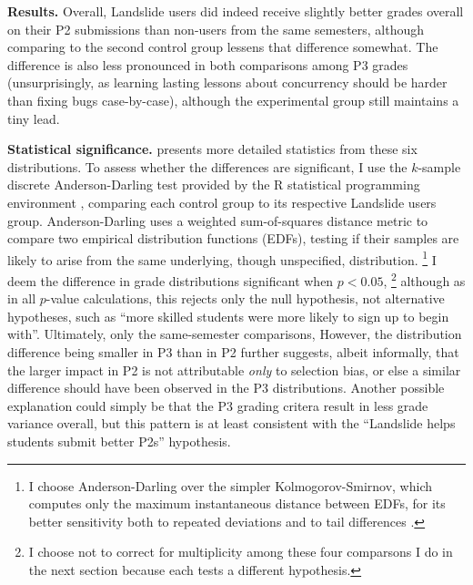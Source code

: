 {\bf Results.}
Overall,
Landslide users did indeed receive
slightly better grades overall on their P2 submissions than non-users from the same semesters,
although comparing to the second control group lessens that difference somewhat.
The difference is also less pronounced in both comparisons among P3 grades
(unsurprisingly, as learning lasting lessons about concurrency should be harder than fixing bugs case-by-case),
although the experimental group still maintains a tiny lead.

{\bf Statistical significance.}
 presents more detailed statistics from these six distributions.
To assess whether the differences are significant,
I use the $k$-sample discrete Anderson-Darling test \cite{anderson1952,anderson-darling}
provided by the R statistical programming environment \cite{r-lang,r-ksamples},
comparing each control group to its respective Landslide users group.
Anderson-Darling uses a weighted sum-of-squares distance metric to compare two empirical distribution functions (EDFs),
testing if their samples are likely to arise from the same underlying, though unspecified, distribution.%
\footnote{
I choose Anderson-Darling over the simpler Kolmogorov-Smirnov,
which computes only the maximum instantaneous distance between EDFs,
for its better sensitivity both to repeated deviations and to tail differences \cite{beware-kolmogorov-smirnov}.
}
I deem the difference in grade distributions significant when $p < 0.05$,%
\footnote{I choose not to correct for multiplicity among these four comparsons  I do in the next section
because each tests a different hypothesis.
}
although as in all $p$-value calculations,
this rejects only the null hypothesis,
not alternative hypotheses,
such as ``more skilled students were more likely to sign up to begin with''.
%
Ultimately, only the same-semester comparisons,
However, the distribution difference being smaller in P3 than in P2
further suggests, albeit informally,
that the larger impact in P2 is not attributable {\em only} to selection bias,
or else a similar difference should have been observed in the P3 distributions.
Another possible explanation could simply be that the P3 grading critera result in less grade variance overall,
but this pattern is at least consistent with the ``Landslide helps students submit better P2s'' hypothesis.

